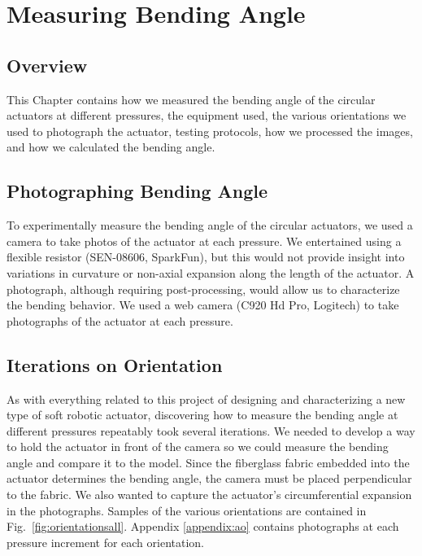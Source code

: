 \chapter{Measuring Bending Angle}
\label{chapter:measurebendingangle}

\section{Overview}
This Chapter contains how we measured the bending angle of the circular actuators at different pressures, the equipment used, the various orientations we used to photograph the actuator, testing protocols, how we processed the images, and how we calculated the bending angle.

\section{Photographing Bending Angle}

To experimentally measure the bending angle of the circular actuators, we used a camera to take photos of the actuator at each pressure. We entertained using a flexible resistor (SEN-08606, SparkFun), but this would not provide insight into variations in curvature or non-axial expansion along the length of the actuator. A photograph, although requiring post-processing, would allow us to characterize the bending behavior. We used a web camera (C920 Hd Pro, Logitech) to take photographs of the actuator at each pressure.

\section{Iterations on Orientation}

As with everything related to this project of designing and characterizing a new type of soft robotic actuator, discovering how to measure the bending angle at different pressures repeatably took several iterations. We needed to develop a way to hold the actuator in front of the camera so we could measure the bending angle and compare it to the model. Since the fiberglass fabric embedded into the actuator determines the bending angle, the camera must be placed perpendicular to the fabric. We also wanted to capture the actuator's circumferential expansion in the photographs. Samples of the various orientations are contained in Fig.~\ref{fig:orientationsall}. Appendix \ref{appendix:ao} contains photographs at each pressure increment for each orientation. 

